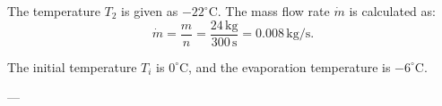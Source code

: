 The temperature \( T_2 \) is given as \( -22^\circ\text{C} \). The mass flow rate \( \dot{m} \) is calculated as:
\[
\dot{m} = \frac{m}{n} = \frac{24 \, \text{kg}}{300 \, \text{s}} = 0.008 \, \text{kg/s}.
\]

The initial temperature \( T_i \) is \( 0^\circ\text{C} \), and the evaporation temperature is \( -6^\circ\text{C} \).

---